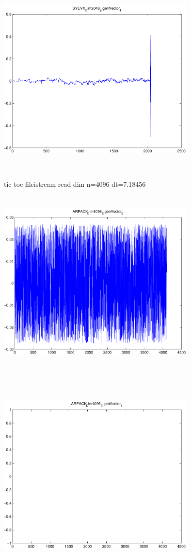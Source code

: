 \documentclass[9pt]{article}
\theoremstyle{plain}
\theoremstyle{definition}
\theoremstyle{remark}
\numberwithin{equation}{section}
\begin{document}
\includegraphics[width=10.0cm,height=10.0cm]{SYEVX_Dim2048_EigenVector_4.pdf}

tic toc fileistream read dim n=4096 dt=7.18456
\includegraphics[width=10.0cm,height=10.0cm]{ARPACK_Dim4096_EigenVector_0.pdf}

\includegraphics[width=10.0cm,height=10.0cm]{ARPACK_Dim4096_EigenVector_1.pdf}
\end{document}
